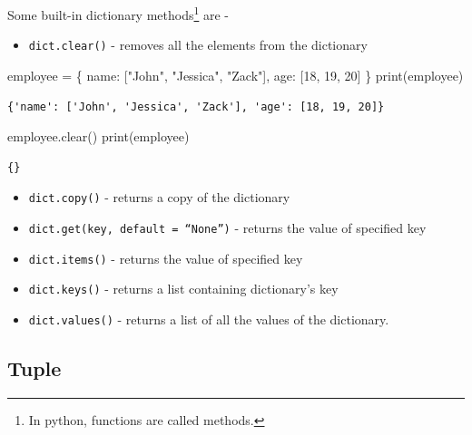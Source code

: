 \documentclass[
  letterpaper,
  DIV=11,
  numbers=noendperiod]{scrreprt}
\newenvironment{Shaded}{\begin{snugshade}}{\end{snugshade}}
\newcommand{\BuiltInTok}[1]{\textcolor[rgb]{0.00,0.23,0.31}{#1}}
\newcommand{\DecValTok}[1]{\textcolor[rgb]{0.68,0.00,0.00}{#1}}
\newcommand{\NormalTok}[1]{\textcolor[rgb]{0.00,0.23,0.31}{#1}}
\newcommand{\OperatorTok}[1]{\textcolor[rgb]{0.37,0.37,0.37}{#1}}
\newcommand{\StringTok}[1]{\textcolor[rgb]{0.13,0.47,0.30}{#1}}
\providecommand{\tightlist}{%
  \setlength{\itemsep}{0pt}\setlength{\parskip}{0pt}}
\begin{document}
Some built-in dictionary methods\footnote{In python, functions are
  called methods.} are -

\begin{itemize}
\tightlist
\item
  \texttt{dict.clear()} - removes all the elements from the dictionary
\end{itemize}

\begin{Shaded}
\begin{Highlighting}[]
\NormalTok{employee }\OperatorTok{=}\NormalTok{ \{}
    \StringTok{\textquotesingle{}name\textquotesingle{}}\NormalTok{: [}\StringTok{"John"}\NormalTok{, }\StringTok{"Jessica"}\NormalTok{, }\StringTok{"Zack"}\NormalTok{], }
    \StringTok{\textquotesingle{}age\textquotesingle{}}\NormalTok{: [}\DecValTok{18}\NormalTok{, }\DecValTok{19}\NormalTok{, }\DecValTok{20}\NormalTok{]}
\NormalTok{\}}
\BuiltInTok{print}\NormalTok{(employee)}
\end{Highlighting}
\end{Shaded}

\begin{verbatim}
{'name': ['John', 'Jessica', 'Zack'], 'age': [18, 19, 20]}
\end{verbatim}

\begin{Shaded}
\begin{Highlighting}[]
\NormalTok{employee.clear()}
\BuiltInTok{print}\NormalTok{(employee)}
\end{Highlighting}
\end{Shaded}

\begin{verbatim}
{}
\end{verbatim}

\begin{itemize}
\item
  \texttt{dict.copy()} - returns a copy of the dictionary
\item
  \texttt{dict.get(key,\ default\ =\ “None”)} - returns the value of
  specified key
\item
  \texttt{dict.items()} - returns the value of specified key
\item
  \texttt{dict.keys()} - returns a list containing dictionary's key
\item
  \texttt{dict.values()} - returns a list of all the values of the
  dictionary.
\end{itemize}

\subsection{Tuple}\label{tuple}
\end{document}
